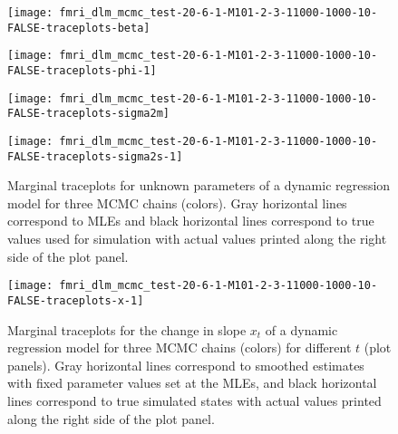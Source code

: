 \documentclass{article}
\begin{document}
\begin{figure}[ht]
\begin{minipage}{0.5\linewidth}
\texttt{[image: fmri\_dlm\_mcmc\_test-20-6-1-M101-2-3-11000-1000-10-FALSE-traceplots-beta]}
\end{minipage}
\begin{minipage}{0.5\linewidth}
\texttt{[image: fmri\_dlm\_mcmc\_test-20-6-1-M101-2-3-11000-1000-10-FALSE-traceplots-phi-1]}
\end{minipage}
\begin{minipage}{0.5\linewidth}
\texttt{[image: fmri\_dlm\_mcmc\_test-20-6-1-M101-2-3-11000-1000-10-FALSE-traceplots-sigma2m]}
\end{minipage}
\begin{minipage}{0.5\linewidth}
\texttt{[image: fmri\_dlm\_mcmc\_test-20-6-1-M101-2-3-11000-1000-10-FALSE-traceplots-sigma2s-1]}
\end{minipage}
\caption{Marginal traceplots for unknown parameters of a dynamic regression model for three MCMC chains (colors). Gray horizontal lines correspond to MLEs and black horizontal lines correspond to true values used for simulation with actual values printed along the right side of the plot panel.} \label{fig:tracetheta}
\end{figure}

\begin{figure}[ht]
\texttt{[image: fmri\_dlm\_mcmc\_test-20-6-1-M101-2-3-11000-1000-10-FALSE-traceplots-x-1]}
\caption{Marginal traceplots for the change in slope $x_t$ of a dynamic regression model for three MCMC chains (colors) for different $t$ (plot panels). Gray horizontal lines correspond to smoothed estimates with fixed parameter values set at the MLEs, and black horizontal lines correspond to true simulated states with actual values printed along the right side of the plot panel.} \label{fig:tracex}
\end{figure}
\end{document}
